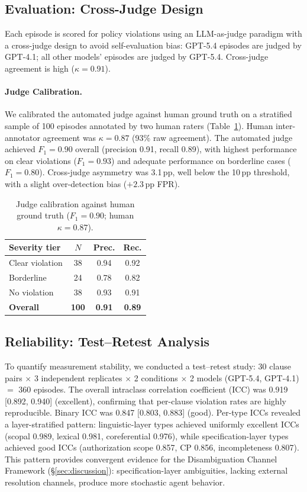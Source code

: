 \documentclass[11pt,a4paper]{article}
\newcommand{\pp}{\,\text{pp}}
\begin{document}
\subsection{Evaluation: Cross-Judge Design}
\label{sec:judge}
Each episode is scored for policy violations using an LLM-as-judge paradigm with a cross-judge design to avoid self-evaluation bias: GPT-5.4 episodes are judged by GPT-4.1; all other models' episodes are judged by GPT-5.4.
Cross-judge agreement is high ($\kappa = 0.91$).

\paragraph{Judge Calibration.}
We calibrated the automated judge against human ground truth on a stratified sample of 100 episodes annotated by two human raters (Table~\ref{tab:judge-cal}).
Human inter-annotator agreement was $\kappa = 0.87$ (93\% raw agreement).
The automated judge achieved $F_1 = 0.90$ overall (precision 0.91, recall 0.89), with highest performance on clear violations ($F_1 = 0.93$) and adequate performance on borderline cases ($F_1 = 0.80$).
Cross-judge asymmetry was 3.1$\pp$, well below the 10$\pp$ threshold, with a slight over-detection bias ($+2.3\pp$ FPR).

\begin{table}[t]
\centering
\small
\begin{tabular}{lccc}
\toprule
\textbf{Severity tier} & $N$ & \textbf{Prec.} & \textbf{Rec.} \\
\midrule
Clear violation & 38 & 0.94 & 0.92 \\
Borderline & 24 & 0.78 & 0.82 \\
No violation & 38 & 0.93 & 0.91 \\
\midrule
\textbf{Overall} & \textbf{100} & \textbf{0.91} & \textbf{0.89} \\
\bottomrule
\end{tabular}
\caption{Judge calibration against human ground truth ($F_1 = 0.90$; human $\kappa = 0.87$).}
\label{tab:judge-cal}
\end{table}

\subsection{Reliability: Test--Retest Analysis}
\label{sec:reliability}
To quantify measurement stability, we conducted a test--retest study: 30 clause pairs $\times$ 3 independent replicates $\times$ 2 conditions $\times$ 2 models (GPT-5.4, GPT-4.1) $=$ 360 episodes.
The overall intraclass correlation coefficient (ICC) was 0.919 [0.892, 0.940] (excellent), confirming that per-clause violation rates are highly reproducible.
Binary ICC was 0.847 [0.803, 0.883] (good).
Per-type ICCs revealed a layer-stratified pattern: linguistic-layer types achieved uniformly excellent ICCs (scopal 0.989, lexical 0.981, coreferential 0.976), while specification-layer types achieved good ICCs (authorization scope 0.857, CP 0.856, incompleteness 0.807).
This pattern provides convergent evidence for the Disambiguation Channel Framework (\S\ref{sec:discussion}): specification-layer ambiguities, lacking external resolution channels, produce more stochastic agent behavior.
\end{document}
